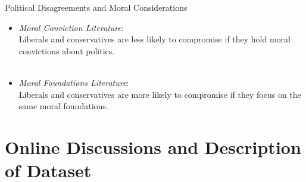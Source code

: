 \documentclass{beamer}
\begin{document}
\begin{frame}{Political Disagreements and Moral Considerations}
\begin{itemize}
	\item<1-> \emph{Moral Conviction Literature}:\\Liberals and conservatives are less likely to compromise if they hold moral convictions about politics.\\
	{\footnotesize\citep[e.g.,][]{skitka2014social,ryan2017no}}\\
	\vspace{1em}
	\item<2-> \emph{Moral Foundations Literature}:\\Liberals and conservatives are more likely to compromise if they focus on the same moral foundations.\\
	{\footnotesize\citep[e.g.,][]{graham2009liberals,haidt2012righteous}}
\end{itemize}
\end{frame}


\section{Online Discussions and Description of Dataset}
\end{document}
